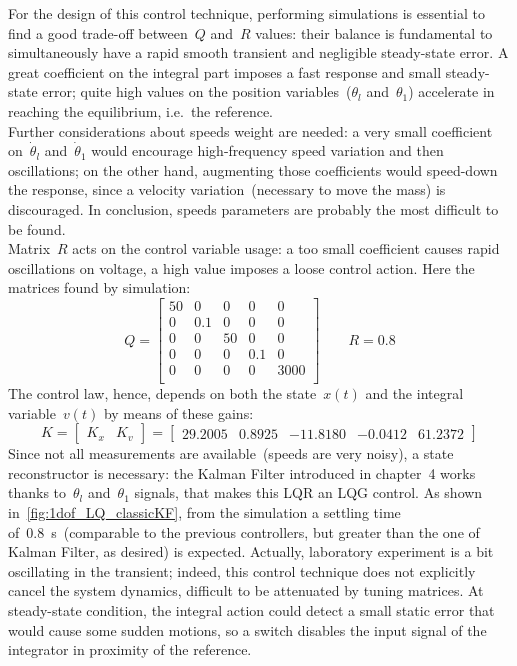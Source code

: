 For the design of this control technique, performing simulations is essential to find a good trade-off between~$Q$ and~$R$ values: their balance is fundamental to simultaneously have a rapid smooth transient and negligible steady-state error. A great coefficient on the integral part imposes a fast response and small steady-state error; quite high values on the position variables~($\theta_l$ and~$\theta_1$) accelerate in reaching the equilibrium, i.e.\ the reference. \\ Further considerations about speeds weight are needed: a very small coefficient on~$\dot \theta_l$ and~$\dot \theta_1$ would encourage high-frequency speed variation and then oscillations; on the other hand, augmenting those coefficients would speed-down the response, since a velocity variation~(necessary to move the mass) is discouraged. In conclusion, speeds parameters are probably the most difficult to be found. \\ Matrix~$R$ acts on the control variable usage: a too small coefficient causes rapid oscillations on voltage, a high value imposes a loose control action.
Here the matrices found by simulation:
\[
	Q =
	\begin{bmatrix}
		50 & 0 & 0 & 0 & 0 \\
		0 & 0.1 & 0 & 0 & 0 \\
		0 & 0 & 50 & 0 & 0 \\
		0 & 0 & 0 & 0.1 & 0 \\
		0 & 0 & 0 & 0 & 3000 \\
	\end{bmatrix}
	\qquad
	R = 0.8
\]
The control law, hence, depends on both the state~$x(t)$ and the integral variable~$v(t)$ by means of these gains:
\begin{equation}
	K =
	\left[
	\begin{array}{c|c}
		K_x & K_v
	\end{array}
	\right]
	=
	\left[
	\begin{array}{cccc|c}
		29.2005 & 0.8925 & -11.8180 & -0.0412 & 61.2372
	\end{array}
	\right]
	\label{eq:1dof_LQ_fastK}
\end{equation}
 Since not all measurements are available~(speeds are very noisy), a state reconstructor is necessary: the Kalman Filter introduced in chapter~4 works thanks to~$\theta_l$ and~$\theta_1$ signals, that makes this LQR an LQG control. As shown in~\cref{fig:1dof_LQ_classicKF}, from the simulation a settling time of~0.8~s~(comparable to the previous controllers, but greater than the one of Kalman Filter, as desired) is expected. Actually, laboratory experiment is a bit oscillating in the transient; indeed, this control technique does not explicitly cancel the system dynamics, difficult to be attenuated by tuning matrices. At steady-state condition, the integral action could detect a small static error that would cause some sudden motions, so a switch disables the input signal of the integrator in proximity of the reference.

